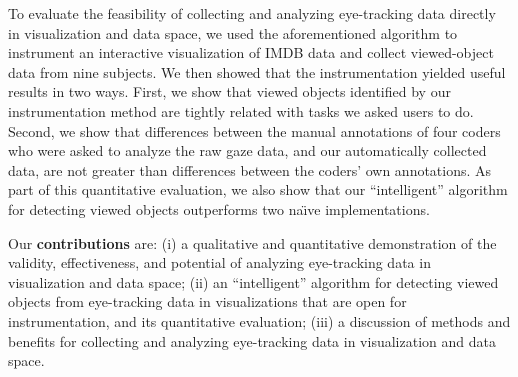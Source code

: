 To evaluate the feasibility of collecting and analyzing eye-tracking data directly in visualization and data space,  we used the aforementioned algorithm to instrument an interactive visualization of IMDB data and collect viewed-object data from nine subjects. We then showed that the instrumentation yielded useful results in two ways. First, we show that viewed objects identified by our instrumentation method are tightly related with tasks we asked users to do. Second, we show that differences between the manual annotations of four coders who were asked to analyze the raw gaze data, and our automatically collected data, are not greater than differences between the coders' own annotations. As part of this quantitative evaluation, we also show that our ``intelligent'' algorithm for detecting viewed objects outperforms two na\"{\i}ve implementations. 

Our \textbf{contributions} are: (i) a qualitative and quantitative demonstration of the validity, effectiveness, and potential of analyzing eye-tracking data in visualization and data space; (ii) an ``intelligent'' algorithm for detecting viewed objects from eye-tracking data in visualizations that are open for instrumentation, and its quantitative evaluation; (iii) a discussion of methods and benefits for collecting and analyzing eye-tracking data in visualization and data space.
